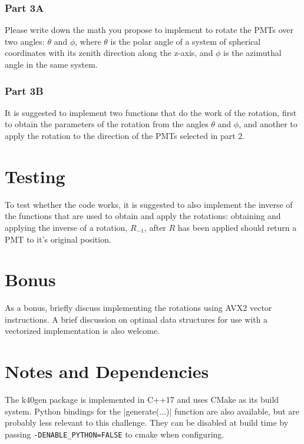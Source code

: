 \documentclass{article}
\begin{document}
\subsubsection{Part 3A}

Please write down the math you propose to implement to rotate the PMTs
over two angles: $\theta$ and $\phi$, where $\theta$ is the polar
angle of a system of spherical coordinates with its zenith direction
along the z-axis, and $\phi$ is the azimuthal angle in the same
system.

\subsubsection{Part 3B}

It is suggested to implement two functions that do the work of the
rotation, first to obtain the parameters of the rotation from the
angles $\theta$ and $\phi$, and another to apply the rotation to the
direction of the PMTs selected in part 2.

\section{Testing}

To test whether the code works, it is suggested to also implement the
inverse of the functions that are used to obtain and apply the
rotations: obtaining and applying the inverse of a rotation,
$R_{-1}$, after $R$ has been applied should return a PMT to it's
original position.

\section{Bonus}

As a bonus, briefly discuss implementing the rotations using AVX2
vector instructions. A brief discussion on optimal data structures for
use with a vectorized implementation is also welcome.

\section{Notes and Dependencies}

The k40gen package is implemented in C++17 and uses CMake as its build
system. Python bindings for the |generate(...)| function are also available,
but are probably less relevant to this challenge. They can be disabled
at build time by passing \verb|-DENABLE_PYTHON=FALSE| to cmake when
configuring.
\end{document}
